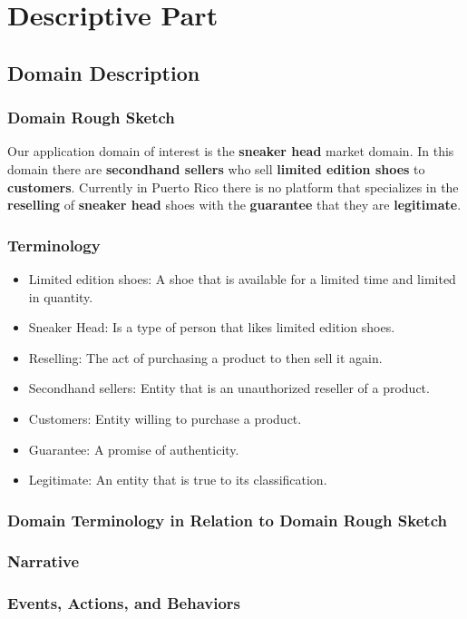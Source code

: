 \chapter{Descriptive Part}
\newpage
\section{Domain Description}
\subsection{Domain Rough Sketch}
Our application domain of interest is the \textbf{sneaker head} market domain. In this domain there are \textbf{secondhand sellers} who sell \textbf{limited edition shoes} to \textbf{customers}. Currently in Puerto Rico there is no platform that specializes in the \textbf{reselling} of \textbf{sneaker head} shoes with the \textbf{guarantee} that they are \textbf{legitimate}.
\subsection{Terminology}
\begin{itemize}
    \item Limited edition shoes: A shoe that is available for a limited time and limited in quantity.
    \item Sneaker Head: Is a type of person that likes limited edition shoes.
    \item Reselling: The act of purchasing a product to then sell it again.
    \item Secondhand sellers: Entity that is an unauthorized reseller of a product.
    \item Customers: Entity willing to purchase a product.
    \item Guarantee: A promise of authenticity.
    \item Legitimate: An entity that is true to its classification.
\end{itemize}
\subsection{Domain Terminology in Relation to Domain Rough Sketch}
\subsection{Narrative}
\subsection{Events, Actions, and Behaviors}

